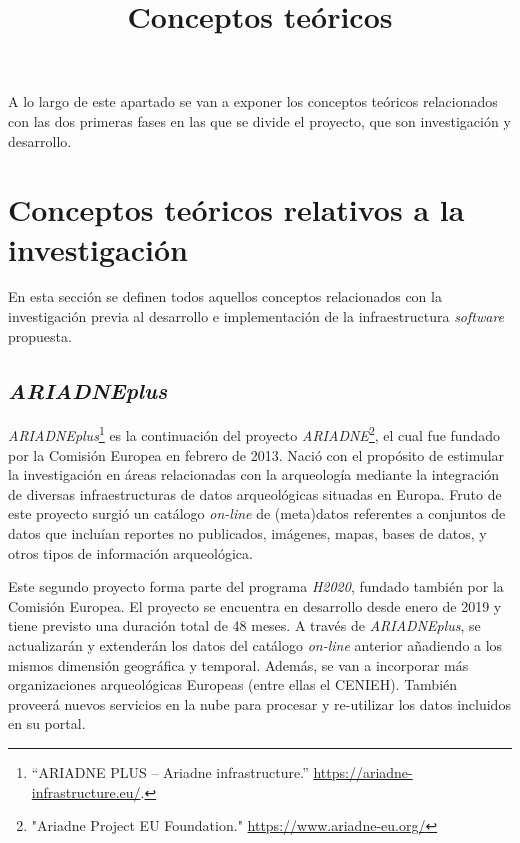 \documentclass[
]{article}
\title{Conceptos teóricos}
\author{}
\date{}
\begin{document}
\maketitle

A lo largo de este apartado se van a exponer los conceptos teóricos
relacionados con las dos primeras fases en las que se divide el
proyecto, que son investigación y desarrollo.

\hypertarget{conceptos-teuxf3ricos-relativos-a-la-investigaciuxf3n}{%
\section{Conceptos teóricos relativos a la
investigación}\label{conceptos-teuxf3ricos-relativos-a-la-investigaciuxf3n}}

En esta sección se definen todos aquellos conceptos relacionados con la
investigación previa al desarrollo e implementación de la
infraestructura \emph{software} propuesta.

\hypertarget{ariadneplus}{%
\subsection{\texorpdfstring{\emph{ARIADNEplus}}{ARIADNEplus}}\label{ariadneplus}}

\emph{ARIADNEplus}\footnote{``ARIADNE PLUS -- Ariadne infrastructure.''
  \url{https://ariadne-infrastructure.eu/}.} es la continuación del
proyecto \emph{ARIADNE}\footnote{"Ariadne Project EU \textbar{}
  Foundation." \url{https://www.ariadne-eu.org/}}, el cual fue fundado
por la Comisión Europea en febrero de 2013. Nació con el propósito de
estimular la investigación en áreas relacionadas con la arqueología
mediante la integración de diversas infraestructuras de datos
arqueológicas situadas en Europa. Fruto de este proyecto surgió un
catálogo \emph{on-line} de (meta)datos referentes a conjuntos de datos
que incluían reportes no publicados, imágenes, mapas, bases de datos, y
otros tipos de información arqueológica.

Este segundo proyecto forma parte del programa \emph{H2020}, fundado
también por la Comisión Europea. El proyecto se encuentra en desarrollo
desde enero de 2019 y tiene previsto una duración total de 48 meses. A
través de \emph{ARIADNEplus}, se actualizarán y extenderán los datos del
catálogo \emph{on-line} anterior añadiendo a los mismos dimensión
geográfica y temporal. Además, se van a incorporar más organizaciones
arqueológicas Europeas (entre ellas el CENIEH). También proveerá nuevos
servicios en la nube para procesar y re-utilizar los datos incluidos en
su portal.
\end{document}

